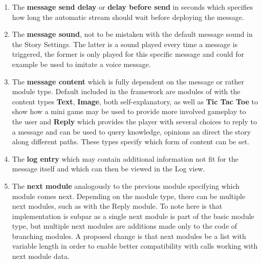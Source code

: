 \begin{enumerate}
\item The \textbf{message send delay} or \textbf{delay before send} in seconds which specifies how long the automatic stream should wait before deploying the message.
\item The \textbf{message sound}, not to be mistaken with the default message sound in the Story Settings. The latter is a sound played every time a message is triggered, the former is only played for this specific message and could for example be used to imitate a voice message.
\item The \textbf{message content} which is fully dependent on the message or rather module type. Default included in the framework are modules of with the content types \textbf{Text}, \textbf{Image}, both self-explanatory, as well as \textbf{Tic Tac Toe} to show how a mini game may be used to provide more involved gameplay to the user and \textbf{Reply} which provides the player with several choices to reply to a message and can be used to query knowledge, opinions an direct the story along different paths. These types specify which form of content can be set.
\item The \textbf{log entry} which may contain additional information not fit for the message itself and which can then be viewed in the Log view.
\item The \textbf{next module} analogously to the previous module specifying which module comes next. Depending on the module type, there can be multiple next modules, such as with the Reply module. To note here is that implementation is subpar as a single next module is part of the basic module type, but multiple next modules are additions made only to the code of branching modules. A proposed change is that next modules be a list with variable length in order to enable better compatibility with calls working with next module data.
\end{enumerate}

